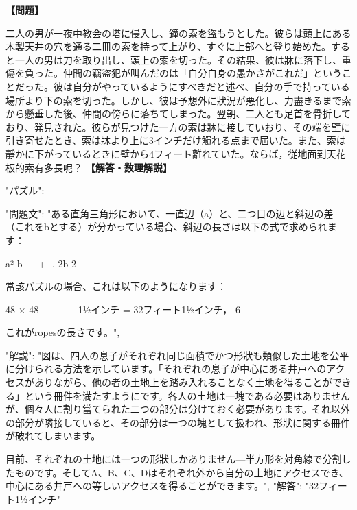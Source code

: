 \documentclass[10pt,a4paper,oneside,openany]{ltjsbook}
\begin{document}
\begin{tcolorbox}[colback=softblue,colframe=primaryblue,title=\textbf{第 179 問：STEALING THE BELL-ROPES.},arc=2mm,boxrule=1pt,breakable]
\textbf{【問題】}\par\vspace{0.3em}
二人の男が一夜中教会の塔に侵入し、鐘の索を盜もうとした。彼らは頭上にある木製天井の穴を通る二冊の索を持って上がり、すぐに上部へと登り始めた。すると一人の男は刀を取り出し、頭上の索を切った。その結果、彼は牀に落下し、重傷を負った。仲間の竊盜犯が叫んだのは「自分自身の愚かさがこれだ」ということだった。彼は自分がやっているようにすべきだと述べ、自分の手で持っている場所より下の索を切った。しかし、彼は予想外に狀況が悪化し、力盡きるまで索から懸垂した後、仲間の傍らに落ちてしまった。翌朝、二人とも足首を骨折しており、発見された。彼らが見つけた一方の索は牀に接していおり、その端を壁に引き寄せたとき、索は牀より上に3インチだけ觸れる点まで屆いた。また、索は靜かに下がっているときに壁から4フィート離れていた。ならば，従地面到天花板的索有多長呢？
\tcblower
\textbf{【解答・数理解説】}\par\vspace{0.3em}
{
    "パズル": {
        "問題文": "ある直角三角形において、一直辺（a）と、二つ目の辺と斜辺の差（これをbとする）が分かっている場合、斜辺の長さは以下の式で求められます：

            a²    b
            --- + -.
            2b    2

        當該パズルの場合、これは以下のようになります：

            48 × 48
            ------- + 1½インチ = 32フィート1½インチ，
               6

        これがropesの長さです。",

        "解説": "図は、四人の息子がそれぞれ同じ面積でかつ形狀も類似した土地を公平に分けられる方法を示しています。「それぞれの息子が中心にある井戸へのアクセスがありながら、他の者の土地上を踏み入れることなく土地を得ることができる」という冊件を満たすようにです。各人の土地は一塊である必要はありませんが、個々人に割り當てられた二つの部分は分けておく必要があります。それ以外の部分が隣接していると、その部分は一つの塊として扱われ、形狀に関する冊件が破れてしまいます。

        目前、それぞれの土地には一つの形狀しかありません—半方形を対角線で分割したものです。そしてA、B、C、Dはそれぞれ外から自分の土地にアクセスでき、中心にある井戸への等しいアクセスを得ることができます。",
        "解答": "32フィート1½インチ"
    }
}
\end{tcolorbox}
\end{document}
